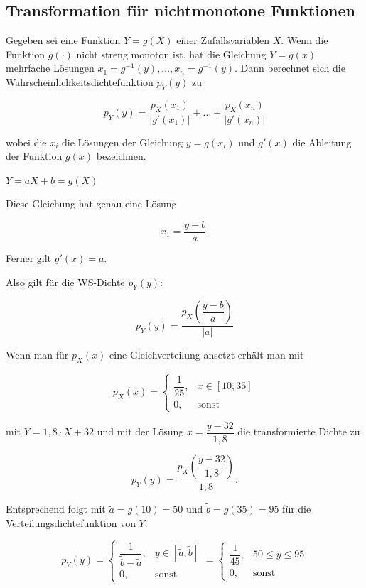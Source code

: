 \subsection{Transformation für nichtmonotone Funktionen}
\label{sec:nichtmonotone-transformation}

\begin{satz}
Gegeben sei eine Funktion $Y = g(X)$ einer Zufallsvariablen $X$. Wenn die Funktion $g(\cdot)$ nicht streng monoton ist, hat die Gleichung $Y = g(x)$ mehrfache Lösungen $x_1 = g^{-1}(y), \ldots, x_n = g^{-1}(y)$. Dann berechnet sich die Wahrscheinlichkeitsdichtefunktion $p_Y(y)$ zu

$$
p_Y(y) = \frac{p_X(x_1)}{|g'(x_1)|} + \ldots + \frac{p_X(x_n)}{|g'(x_n)|}
$$

wobei die $x_i$ die Lösungen der Gleichung $y = g(x_i)$ und $g'(x)$ die Ableitung der Funktion $g(x)$ bezeichnen.
\end{satz}

\begin{beispiel}
$Y = aX + b = g(X)$

Diese Gleichung hat genau eine Lösung

$$
x_1 = \frac{y - b}{a}.
$$

Ferner gilt $g'(x) = a$.

Also gilt für die WS-Dichte $p_Y(y)$:

$$
p_Y(y) = \frac{p_X\!\left(\dfrac{y-b}{a}\right)}{|a|}
$$

Wenn man für $p_X(x)$ eine Gleichverteilung ansetzt erhält man mit

$$
p_X(x) = \begin{cases} \dfrac{1}{25}, & x \in [10, 35] \\ 0, & \text{sonst} \end{cases}
$$

mit $Y = 1{,}8 \cdot X + 32$ und mit der Lösung $x = \dfrac{y - 32}{1{,}8}$ die transformierte Dichte zu

$$
p_Y(y) = \frac{p_X\!\left(\dfrac{y-32}{1{,}8}\right)}{1{,}8}.
$$

Entsprechend folgt mit $\tilde{a} = g(10) = 50$ und $\tilde{b} = g(35) = 95$ für die Verteilungsdichtefunktion von $Y$:

$$
p_Y(y) = \begin{cases} \dfrac{1}{\tilde{b} - \tilde{a}}, & y \in [\tilde{a}, \tilde{b}] \\ 0, & \text{sonst} \end{cases}
= \begin{cases} \dfrac{1}{45}, & 50 \leq y \leq 95 \\ 0, & \text{sonst} \end{cases}
$$
\end{beispiel}

